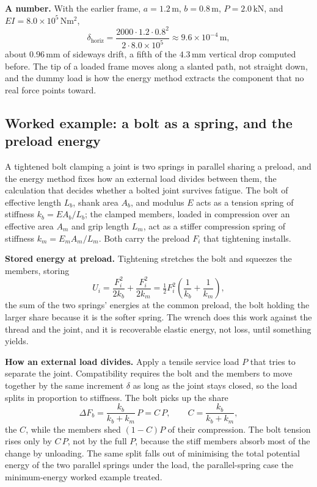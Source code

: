 \textbf{A number.} With the earlier frame, $a = 1.2\,\si{\meter}$, $b =
0.8\,\si{\meter}$, $P = 2.0\,\si{\kilo\newton}$, and $EI = 8.0\times 10^{5}
\,\si{\newton\meter\squared}$,
\[
\delta_\text{horiz} = \frac{2000\cdot 1.2\cdot 0.8^2}{2\cdot 8.0\times 10^{5}}
\approx 9.6\times 10^{-4}\,\si{\meter},
\]
about $0.96\,\si{\milli\meter}$ of sideways drift, a fifth of the
$4.3\,\si{\milli\meter}$ vertical drop computed before. The tip of a loaded
frame moves along a slanted path, not straight down, and the dummy load is
how the energy method extracts the component that no real force points
toward.

\subsection{Worked example: a bolt as a spring, and the preload energy}

A tightened bolt clamping a joint is two springs in parallel sharing a
preload, and the energy method fixes how an external load divides between
them, the calculation that decides whether a bolted joint survives fatigue.
The bolt of effective length $L_b$, shank area $A_b$, and modulus $E$ acts
as a tension spring of stiffness $k_b = E A_b/L_b$; the clamped members,
loaded in compression over an effective area $A_m$ and grip length $L_m$,
act as a stiffer compression spring of stiffness $k_m = E_m A_m/L_m$. Both
carry the preload $F_i$ that tightening installs.

\textbf{Stored energy at preload.} Tightening stretches the bolt and
squeezes the members, storing
\[
U_i = \frac{F_i^2}{2 k_b} + \frac{F_i^2}{2 k_m}
= \tfrac12 F_i^2\!\left(\frac{1}{k_b}+\frac{1}{k_m}\right),
\]
the sum of the two springs' energies at the common preload, the bolt
holding the larger share because it is the softer spring. The wrench does
this work against the thread and the joint, and it is recoverable elastic
energy, not loss, until something yields.

\textbf{How an external load divides.} Apply a tensile service load $P$ that
tries to separate the joint. Compatibility requires the bolt and the members
to move together by the same increment $\delta$ as long as the joint stays
closed, so the load splits in proportion to stiffness. The bolt picks up
the share
\[
\Delta F_b = \frac{k_b}{k_b + k_m}\,P = C\,P,
\qquad C = \frac{k_b}{k_b+k_m},
\]
the  $C$, while the members shed $(1-C)P$
of their compression. The bolt tension rises only by $C\,P$, not by the full
$P$, because the stiff members absorb most of the change by unloading. The
same split falls out of minimising the total potential energy of the two
parallel springs under the load, the parallel-spring case the
minimum-energy worked example treated.

